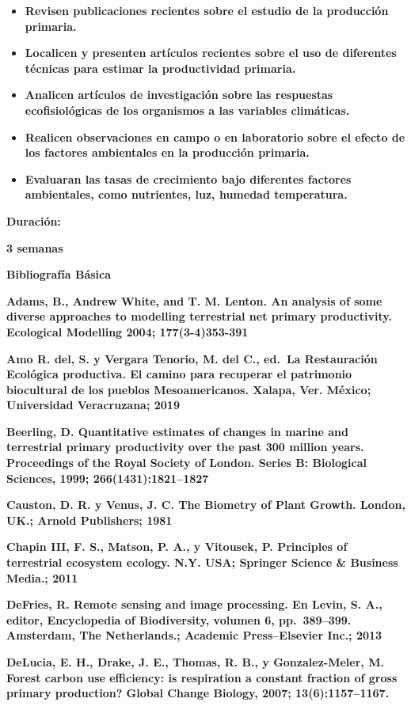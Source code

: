 \documentclass[
]{article}
\begin{document}
\begin{itemize}
\item
  \textbf{Revisen publicaciones recientes sobre el estudio de la
  producción primaria.}
\item
  \textbf{Localicen y presenten artículos recientes sobre el uso de
  diferentes técnicas para estimar la productividad primaria.}
\item
  \textbf{Analicen artículos de investigación sobre las respuestas
  ecofisiológicas de los organismos a las variables climáticas.}
\item
  \textbf{Realicen observaciones en campo o en laboratorio sobre el
  efecto de los factores ambientales en la producción primaria.}
\item
  \textbf{Evaluaran las tasas de crecimiento bajo diferentes factores
  ambientales, como nutrientes, luz, humedad temperatura.}
\end{itemize}

\textbf{Duración:}

\textbf{3 semanas}

\textbf{Bibliografía Básica}

\textbf{Adams, B., Andrew White, and T. M. Lenton. An analysis of some
diverse approaches to modelling terrestrial net primary productivity.
Ecological Modelling 2004; 177(3-4)353-391}

\textbf{Amo R. del, S. y Vergara Tenorio, M. del C., ed.~La Restauración
Ecológica productiva. El camino para recuperar el patrimonio biocultural
de los pueblos Mesoamericanos. Xalapa, Ver. México; Universidad
Veracruzana; 2019}

\textbf{Beerling, D. Quantitative estimates of changes in marine and
terrestrial primary productivity over the past 300 million years.
Proceedings of the Royal Society of London. Series B: Biological
Sciences, 1999; 266(1431):1821--1827}

\textbf{Causton, D. R. y Venus, J. C. The Biometry of Plant Growth.
London, UK.; Arnold Publishers; 1981}

\textbf{Chapin III, F. S., Matson, P. A., y Vitousek, P. Principles of
terrestrial ecosystem ecology. N.Y. USA; Springer Science \& Business
Media.; 2011}

\textbf{DeFries, R. Remote sensing and image processing. En Levin, S.
A., editor, Encyclopedia of Biodiversity, volumen 6, pp.~389--399.
Amsterdam, The Netherlands.; Academic Press--Elsevier Inc.; 2013}

\textbf{DeLucia, E. H., Drake, J. E., Thomas, R. B., y Gonzalez-Meler,
M. Forest carbon use efficiency: is respiration a constant fraction of
gross primary production? Global Change Biology, 2007;
13(6):1157--1167.}
\end{document}
